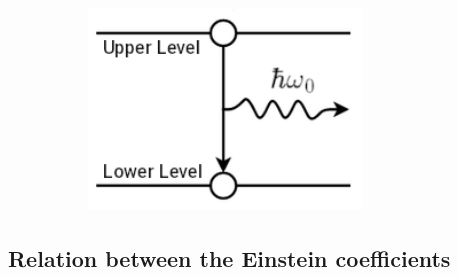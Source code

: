 \begin{figure}[H]
\begin{subfigure}[t]{0.32\textwidth}
	\end{subfigure}
	\hfill
	\begin{subfigure}[t]{0.32\textwidth}
		\centering
		\includegraphics[width=0.8\textwidth]{USPSC-img/spontaneous_emission.png}
		\vspace{5pt}
		\label{img:spontaneous-emission}
	\end{subfigure}

	\vspace{-20pt}
	\label{fig:optical-transitions}
\end{figure}

%
\subsection{Relation between the Einstein coefficients}
%

